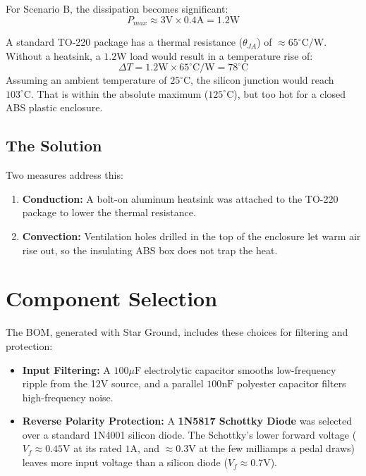 \documentclass[11pt, a4paper]{report}
\begin{document}
For Scenario B, the dissipation becomes significant:
\begin{equation}
  P_{max} \approx 3\text{V} \times 0.4\text{A} = 1.2\text{W}
\end{equation}

A standard TO-220 package has a thermal resistance ($\theta_{JA}$) of $\approx 65^\circ \text{C/W}$.\cite{st_l7809cv_datasheet} Without a heatsink, a $1.2\text{W}$ load would result in a temperature rise of:
\begin{equation}
  \Delta T = 1.2\text{W} \times 65^\circ \text{C/W} = 78^\circ \text{C}
\end{equation}
Assuming an ambient temperature of $25^\circ \text{C}$, the silicon junction would reach $103^\circ \text{C}$. That is within the absolute maximum ($125^\circ \text{C}$), but too hot for a closed ABS plastic enclosure.\cite{st_l7809cv_datasheet}

\subsection{The Solution}
Two measures address this:
\begin{enumerate}
  \item \textbf{Conduction:} A bolt-on aluminum heatsink was attached to the TO-220 package to lower the thermal resistance.
  \item \textbf{Convection:} Ventilation holes drilled in the top of the enclosure let warm air rise out, so the insulating ABS box does not trap the heat.
\end{enumerate}

\section{Component Selection}
The BOM, generated with Star Ground, includes these choices for filtering and protection:

\begin{itemize}
  \item \textbf{Input Filtering:} A $100\mu\text{F}$ electrolytic capacitor smooths low-frequency ripple from the 12V source, and a parallel $100\text{nF}$ polyester capacitor filters high-frequency noise.\cite{st_l7809cv_datasheet}
  \item \textbf{Reverse Polarity Protection:} A \textbf{1N5817 Schottky Diode} was selected over a standard 1N4001 silicon diode.\cite{diode_1n5817_datasheet,diode_1n4001_datasheet} The Schottky's lower forward voltage ($V_f \approx 0.45\text{V}$ at its rated $1\text{A}$, and $\approx 0.3\text{V}$ at the few milliamps a pedal draws) leaves more input voltage than a silicon diode ($V_f \approx 0.7\text{V}$).\cite{diode_1n5817_datasheet,diode_1n4001_datasheet}
\end{itemize}
\end{document}
